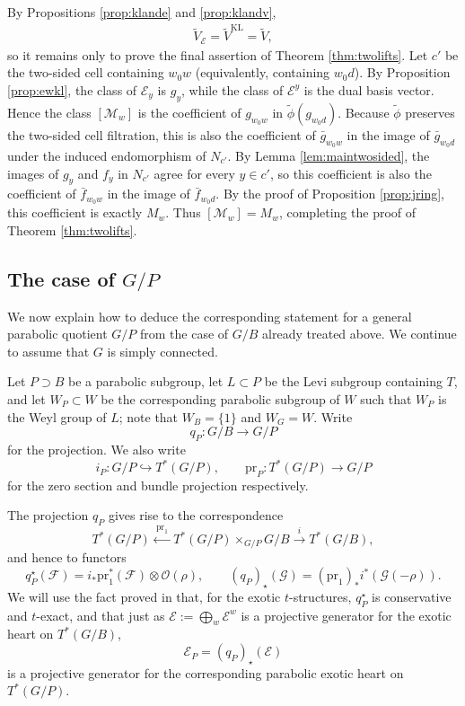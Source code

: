 \documentclass{amsart}
\theoremstyle{definition}
\renewcommand{\O}{\mathcal{O}}
\begin{document}
By Propositions \ref{prop:klande} and \ref{prop:klandv},
\begin{align}
    \tilde{V}_{\mathcal{E}} = \tilde{V}^{\mathrm{KL}} = \tilde{V},
\end{align}
so it remains only to prove the final assertion of Theorem \ref{thm:twolifts}. Let $c'$ be the two-sided cell containing $w_0w$ (equivalently, containing $w_0d$). By Proposition \ref{prop:ewkl}, the class of $\mathcal{E}_{y}$ is $g_y$, while the class of $\mathcal{E}^{y}$ is the dual basis vector. Hence the class $[\mathcal{M}_w]$ is the coefficient of $g_{w_0w}$ in $\tilde{\phi}(g_{w_0d})$. Because $\tilde{\phi}$ preserves the two-sided cell filtration, this is also the coefficient of $\bar g_{w_0w}$ in the image of $\bar g_{w_0d}$ under the induced endomorphism of $N_{c'}$. By Lemma \ref{lem:maintwosided}, the images of $g_y$ and $f_y$ in $N_{c'}$ agree for every $y \in c'$, so this coefficient is also the coefficient of $\bar f_{w_0w}$ in the image of $\bar f_{w_0d}$. By the proof of Proposition \ref{prop:jring}, this coefficient is exactly $M_w$. Thus $[\mathcal{M}_w] = M_w$, completing the proof of Theorem \ref{thm:twolifts}.

\subsection{The case of $G/P$}\label{sec:categorification-gp}

We now explain how to deduce the corresponding statement for a general
parabolic quotient $G/P$ from the case of $G/B$ already treated above.
We continue to assume that $G$ is simply connected.

Let $P\supset B$ be a parabolic subgroup, let $L\subset P$ be the Levi subgroup
containing $T$, and let $W_P\subset W$ be the corresponding parabolic subgroup of $W$ such that $W_P$ is the Weyl group of $L$; note that $W_B = \{1\}$ and $W_G = W$.
Write
\[
q_P\colon G/B\to G/P
\]
for the projection.
We also write
\[
i_P\colon G/P\hookrightarrow T^*(G/P), \qquad
\mathrm{pr}_P\colon T^*(G/P)\to G/P
\]
for the zero section and bundle projection respectively.

The projection $q_P$ gives rise to the correspondence
\[
T^*(G/P)\xleftarrow{\ \mathrm{pr}_1\ } T^*(G/P)\times_{G/P}G/B \xrightarrow{\ i\ } T^*(G/B),
\]
and hence to functors
\[
q_P^\star(\mathcal F)=i_*\mathrm{pr}_1^*(\mathcal F)\otimes \O(\rho),
\qquad
(q_P)_\star(\mathcal G)=(\mathrm{pr}_1)_*i^*(\mathcal G(-\rho)).
\]
We will use the fact proved in \cite{BM} that, for the exotic $t$-structures,
$q_P^\star$ is conservative and $t$-exact, and that just as
$\mathcal E := \bigoplus_w \mathcal E^w$ is a projective generator for the exotic heart on
$T^*(G/B)$,
\[
\mathcal E_{P} = (q_P)_\star(\mathcal E)
\]
is a projective generator for the corresponding parabolic exotic heart on
$T^*(G/P)$.
\end{document}

